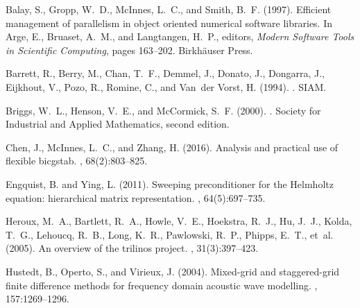 \documentclass[10pt]{article}
\begin{document}

%

\newcommand{\SortNoop}[1]{}
\begin{thebibliography}{}

Balay, S., Gropp, W.~D., McInnes, L.~C., and Smith, B.~F. (1997).
\newblock Efficient management of parallelism in object oriented numerical
  software libraries.
\newblock In Arge, E., Bruaset, A.~M., and Langtangen, H.~P., editors, {\em
  Modern Software Tools in Scientific Computing}, pages 163--202.
  Birkh{\"{a}}user Press.

Barrett, R., Berry, M., Chan, T.~F., Demmel, J., Donato, J., Dongarra, J.,
  Eijkhout, V., Pozo, R., Romine, C., and Van~der Vorst, H. (1994).
.
\newblock SIAM.

Briggs, W.~L., Henson, V.~E., and McCormick, S.~F. (2000).
.
\newblock Society for Industrial and Applied Mathematics, second edition.

Chen, J., McInnes, L.~C., and Zhang, H. (2016).
\newblock Analysis and practical use of flexible bicgstab.
, 68(2):803--825.

Engquist, B. and Ying, L. (2011).
\newblock Sweeping preconditioner for the {H}elmholtz equation: hierarchical
  matrix representation.
, 64(5):697--735.

Heroux, M.~A., Bartlett, R.~A., Howle, V.~E., Hoekstra, R.~J., Hu, J.~J.,
  Kolda, T.~G., Lehoucq, R.~B., Long, K.~R., Pawlowski, R.~P., Phipps, E.~T.,
  et~al. (2005).
\newblock An overview of the trilinos project.
,
  31(3):397--423.

Hustedt, B., Operto, S., and Virieux, J. (2004).
\newblock Mixed-grid and staggered-grid finite difference methods for frequency
  domain acoustic wave modelling.
, 157:1269--1296.


\end{thebibliography}
\end{document}
